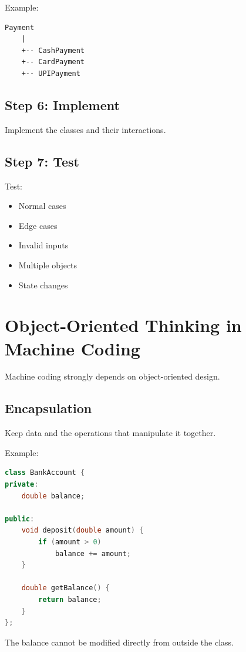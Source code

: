 \documentclass[12pt,a4paper]{article}
\begin{document}
Example:

\begin{verbatim}
Payment
    |
    +-- CashPayment
    +-- CardPayment
    +-- UPIPayment
\end{verbatim}

\subsection{Step 6: Implement}

Implement the classes and their interactions.

\subsection{Step 7: Test}

Test:

\begin{itemize}
    \item Normal cases
    \item Edge cases
    \item Invalid inputs
    \item Multiple objects
    \item State changes
\end{itemize}

\section{Object-Oriented Thinking in Machine Coding}

Machine coding strongly depends on object-oriented design.

\subsection{Encapsulation}

Keep data and the operations that manipulate it together.

Example:

\begin{lstlisting}[language=C++]
class BankAccount {
private:
    double balance;

public:
    void deposit(double amount) {
        if (amount > 0)
            balance += amount;
    }

    double getBalance() {
        return balance;
    }
};
\end{lstlisting}

The balance cannot be modified directly from outside the class.
\end{document}

